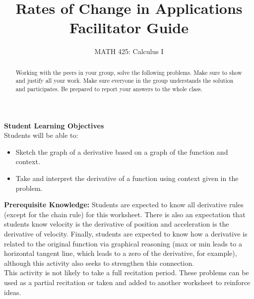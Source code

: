 \documentclass{ximera}
\title{Rates of Change in Applications Facilitator Guide}
\author{MATH 425: Calculus I}
\begin{document}
\begin{abstract}
    Working with the peers in your group, solve the following problems. Make sure to show and justify all your work. Make sure everyone in the group understands the solution and participates. Be prepared to report your answers to the whole class. 
\end{abstract}
\maketitle

\textbf{Student Learning Objectives}\\
Students will be able to:
    \begin{itemize}
        \item Sketch the graph of a derivative based on a graph of the function and context.
        \item Take and interpret the derivative of a function using context given in the problem.
    \end{itemize}

\textbf{Prerequisite Knowledge:} Students are expected to know all derivative rules (except for the chain rule) for this worksheet.  There is also an expectation that students know velocity is the derivative of position and acceleration is the derivative of velocity.  Finally, students are expected to know how a derivative is related to the original function via graphical reasoning (max or min leads to a horizontal tangent line, which leads to a zero of the derivative, for example), although this activity also seeks to strengthen this connection.\\

This activity is not likely to take a full recitation period.  These problems can be used as a partial recitation or taken and added to another worksheet to reinforce ideas.
\end{document}
